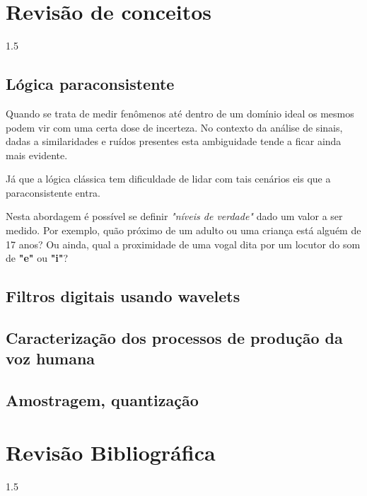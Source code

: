 \documentclass[a4paper,12pt,openright,oneside]{book}
\newenvironment{myenv}[1]
  {\begin{spacing}{#1}}
  {\end{spacing}}
\begin{document}
	\chapter{Revisão de conceitos}
		\begin{myenv}{1.5}
			\section{Lógica paraconsistente}
			\par Quando se trata de medir fenômenos até dentro de um domínio ideal os mesmos podem vir com uma certa dose de incerteza. No contexto da análise de sinais, dadas a similaridades e ruídos presentes esta ambiguidade tende a ficar ainda mais evidente.
			\par Já que a lógica clássica tem dificuldade de lidar com tais cenários eis que a paraconsistente entra.
			\par Nesta abordagem é possível se definir \textit{"níveis de verdade"} dado um valor a ser medido. Por exemplo, quão próximo de um adulto ou uma criança está alguém de 17 anos? Ou ainda, qual a proximidade de uma vogal dita por um locutor do som de \textbf{"e"} ou \textbf{"i"}? 
			
			\section{Filtros digitais usando wavelets}
			\section{Caracterização dos processos de produção da voz humana}
			\section{Amostragem, quantização}
		
		\end{myenv}

	\chapter{Revisão Bibliográfica}
		\begin{myenv}{1.5}
			\par 
		\end{myenv}
	
\end{document}
